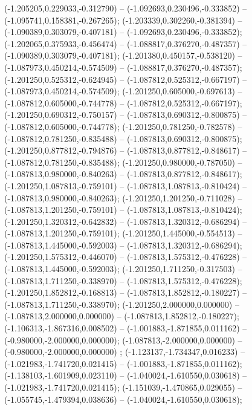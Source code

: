  (-1.205205,0.229033,-0.312790) -- (-1.092693,0.230496,-0.333852) -- (-1.095741,0.158381,-0.267265);
 (-1.203339,0.302260,-0.381394) -- (-1.090389,0.303079,-0.407181) -- (-1.092693,0.230496,-0.333852);
 (-1.202065,0.375933,-0.456474) -- (-1.088817,0.376270,-0.487357) -- (-1.090389,0.303079,-0.407181);
 (-1.201380,0.450157,-0.538120) -- (-1.087973,0.450214,-0.574509) -- (-1.088817,0.376270,-0.487357);
 (-1.201250,0.525312,-0.624945) -- (-1.087812,0.525312,-0.667197) -- (-1.087973,0.450214,-0.574509);
 (-1.201250,0.605000,-0.697613) -- (-1.087812,0.605000,-0.744778) -- (-1.087812,0.525312,-0.667197);
 (-1.201250,0.690312,-0.750157) -- (-1.087813,0.690312,-0.800875) -- (-1.087812,0.605000,-0.744778);
 (-1.201250,0.781250,-0.782578) -- (-1.087812,0.781250,-0.835488) -- (-1.087813,0.690312,-0.800875);
 (-1.201250,0.877812,-0.794876) -- (-1.087813,0.877812,-0.848617) -- (-1.087812,0.781250,-0.835488);
 (-1.201250,0.980000,-0.787050) -- (-1.087813,0.980000,-0.840263) -- (-1.087813,0.877812,-0.848617);
 (-1.201250,1.087813,-0.759101) -- (-1.087813,1.087813,-0.810424) -- (-1.087813,0.980000,-0.840263);
 (-1.201250,1.201250,-0.711028) -- (-1.087813,1.201250,-0.759101) -- (-1.087813,1.087813,-0.810424);
 (-1.201250,1.320312,-0.642832) -- (-1.087813,1.320312,-0.686294) -- (-1.087813,1.201250,-0.759101);
 (-1.201250,1.445000,-0.554513) -- (-1.087813,1.445000,-0.592003) -- (-1.087813,1.320312,-0.686294);
 (-1.201250,1.575312,-0.446070) -- (-1.087813,1.575312,-0.476228) -- (-1.087813,1.445000,-0.592003);
 (-1.201250,1.711250,-0.317503) -- (-1.087813,1.711250,-0.338970) -- (-1.087813,1.575312,-0.476228);
 (-1.201250,1.852812,-0.168813) -- (-1.087813,1.852812,-0.180227) -- (-1.087813,1.711250,-0.338970);
 (-1.201250,2.000000,0.000000) -- (-1.087813,2.000000,0.000000) -- (-1.087813,1.852812,-0.180227);
 (-1.106313,-1.867316,0.008502) -- (-1.001883,-1.871855,0.011162) -- (-0.980000,-2.000000,0.000000);
 (-1.087813,-2.000000,0.000000) -- (-0.980000,-2.000000,0.000000) ;
 (-1.123137,-1.734347,0.016233) -- (-1.021983,-1.741720,0.021415) -- (-1.001883,-1.871855,0.011162);
 (-1.138103,-1.601909,0.023110) -- (-1.040024,-1.610550,0.030618) -- (-1.021983,-1.741720,0.021415);
 (-1.151039,-1.470865,0.029055) -- (-1.055745,-1.479394,0.038636) -- (-1.040024,-1.610550,0.030618);
